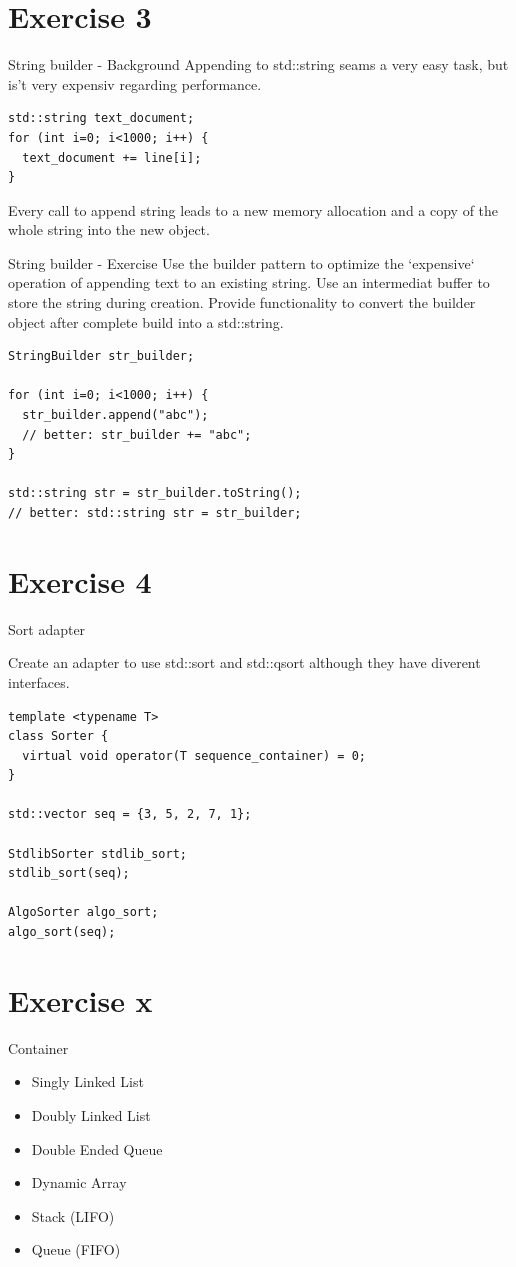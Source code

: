 \documentclass{beamer}
\begin{document}
\section{Exercise 3}

\begin{frame}[fragile]{String builder - Background}
Appending to std::string seams a very easy task, but is't very expensiv
regarding performance.

\begin{lstlisting}
std::string text_document;
for (int i=0; i<1000; i++) {
  text_document += line[i];
}
\end{lstlisting}

Every call to append string leads to a new memory allocation and a copy
of the whole string into the new object.
\end{frame}

\begin{frame}[fragile]{String builder - Exercise}
Use the builder pattern to optimize the `expensive` operation of appending text
to an existing string. Use an intermediat buffer to store the string during
creation. Provide functionality to convert the builder object after complete
build into a std::string.

\begin{lstlisting}
StringBuilder str_builder;

for (int i=0; i<1000; i++) {
  str_builder.append("abc");
  // better: str_builder += "abc";
}

std::string str = str_builder.toString();
// better: std::string str = str_builder;
\end{lstlisting}

\end{frame}

\section{Exercise 4}
\begin{frame}[fragile]{Sort adapter}

Create an adapter to use std::sort and std::qsort although they have diverent
interfaces.

\begin{lstlisting}
template <typename T>
class Sorter {
  virtual void operator(T sequence_container) = 0;
}

std::vector seq = {3, 5, 2, 7, 1};

StdlibSorter stdlib_sort;
stdlib_sort(seq);

AlgoSorter algo_sort;
algo_sort(seq);
\end{lstlisting}

\end{frame}

\section{Exercise x}

\begin{frame}{Container}
\begin{itemize}
  \item Singly Linked List
  \item Doubly Linked List
  \item Double Ended Queue
  \item Dynamic Array
  \item Stack (LIFO)
  \item Queue (FIFO)
\end{itemize}
\end{frame}
\end{document}
